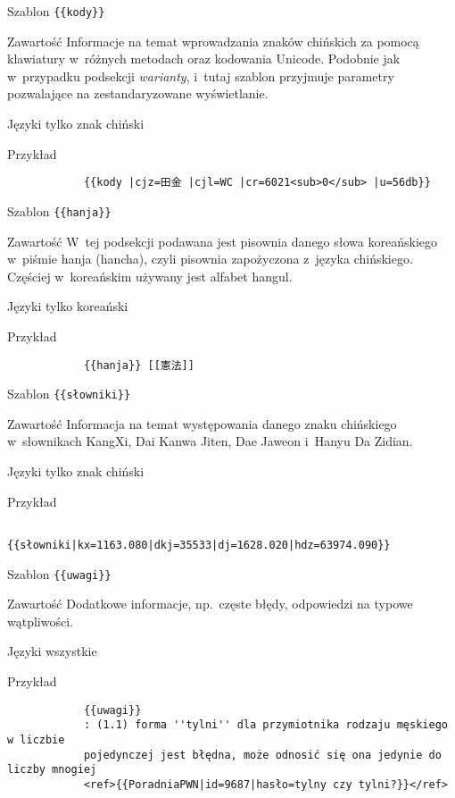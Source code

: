 \spacer
\begin{opis}
	\item[Szablon] \verb|{{kody}}|
	\item[Zawartość] Informacje na temat wprowadzania znaków chińskich za pomocą klawiatury w~różnych metodach oraz kodowania Unicode. Podobnie jak w~przypadku podsekcji \emph{warianty}, i~tutaj szablon przyjmuje parametry pozwalające na zestandaryzowane wyświetlanie.
	\item[Języki] tylko znak chiński
	\item[Przykład]
		\begin{verbatim}
			{{kody |cjz=田金 |cjl=WC |cr=6021<sub>0</sub> |u=56db}}
		\end{verbatim}
\end{opis}
\spacer
\begin{opis}
	\item[Szablon] \verb|{{hanja}}|
	\item[Zawartość] W~tej podsekcji podawana jest pisownia danego słowa koreańskiego w~piśmie hanja (hancha), czyli pisownia zapożyczona z~języka chińskiego. Częściej w~koreańskim używany jest alfabet hangul.
	\item[Języki] tylko koreański
	\item[Przykład]
		\begin{verbatim}
			{{hanja}} [[憲法]]
		\end{verbatim}
\end{opis}
\spacer
\begin{opis}
	\item[Szablon] \verb|{{słowniki}}|
	\item[Zawartość] Informacja na temat występowania danego znaku chińskiego w~słownikach KangXi, Dai Kanwa Jiten, Dae Jaweon i~Hanyu Da Zidian.
	\item[Języki] tylko znak chiński
	\item[Przykład]
		\begin{verbatim}
			{{słowniki|kx=1163.080|dkj=35533|dj=1628.020|hdz=63974.090}}
		\end{verbatim}
\end{opis}
\spacer
\begin{opis}
	\item[Szablon] \verb|{{uwagi}}|
	\item[Zawartość] Dodatkowe informacje, np.\ częste błędy, odpowiedzi na typowe wątpliwości.
	\item[Języki] wszystkie
	\item[Przykład]
		\begin{verbatim}
			{{uwagi}}
			: (1.1) forma ''tylni'' dla przymiotnika rodzaju męskiego w liczbie
			pojedynczej jest błędna, może odnosić się ona jedynie do liczby mnogiej
			<ref>{{PoradniaPWN|id=9687|hasło=tylny czy tylni?}}</ref>
		\end{verbatim}
\end{opis}
